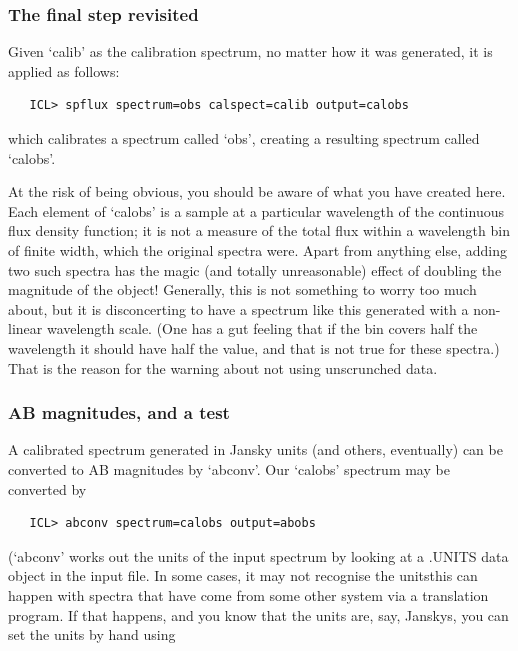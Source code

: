 
\subsubsection{\label{techno5final2}The final step revisited}

   Given `calib' as the calibration spectrum, no matter how it was
   generated, it is applied as follows:

\begin{verbatim}
   ICL> spflux spectrum=obs calspect=calib output=calobs
\end{verbatim}

   which calibrates a spectrum called `obs', creating a resulting
   spectrum called `calobs'.

   At the risk of being obvious, you should be aware of what you have
   created here.  Each element of `calobs' is a sample at a particular
   wavelength of the continuous flux density function; it is not a
   measure of the total flux within a wavelength bin of finite width,
   which the original spectra were.  Apart from anything else, adding
   two such spectra has the magic (and totally unreasonable) effect of
   doubling the magnitude of the object! Generally, this is not
   something to worry too much about, but it is disconcerting to have a
   spectrum like this generated with a non-linear wavelength scale. (One
   has a gut feeling that if the bin covers half the wavelength it
   should have half the value, and that is not true for these spectra.)
   That is the reason for the warning about not using unscrunched data.


\subsubsection{\label{techno5abmag}AB magnitudes, and a test}

   A calibrated spectrum generated in Jansky units (and others,
   eventually) can be converted to AB magnitudes by `abconv'.  Our
   `calobs' spectrum may be converted by

\begin{verbatim}
   ICL> abconv spectrum=calobs output=abobs
\end{verbatim}

   (`abconv' works out the units of the input spectrum by looking at a
   .UNITS data object in the input file.  In some cases, it may not
   recognise the units\latorhtm{---}{-}this can happen with spectra that
   have come
   from some other system via a translation program.  If that happens,
   and you know that the units are, say, Janskys, you can set the units
   by hand using

